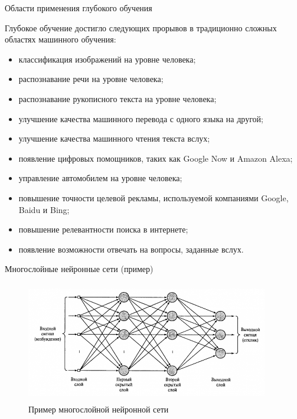 \documentclass[unicode,9pt, pdf]{beamer}
\begin{document}
	\begin{frame}{Области применения глубокого обучения}

    \vspace{0.5cm}
	Глубокое обучение достигло следующих прорывов в традиционно 
сложных областях машинного обучения:
        \begin{itemize}
            \item классификация изображений на уровне человека;
            \item распознавание речи на уровне человека;
            \item распознавание рукописного текста на уровне человека;
            \item улучшение качества машинного перевода с одного языка на другой;
            \item улучшение качества машинного чтения текста вслух;
            \item появление цифровых помощников, таких как Google Now и Amazon Alexa;
            \item управление автомобилем на уровне человека;
            \item повышение точности целевой рекламы, используемой компаниями Google, Baidu и Bing;
            \item повышение релевантности поиска в интернете;
            \item появление возможности отвечать на вопросы, заданные вслух.
        
        \end{itemize}
    \vspace{0.5cm}
        
	\end{frame}	
	
	\begin{frame}{Многослойные нейронные сети (пример)}
	    \begin{figure}
	        \centering
	        \includegraphics[width=300pt, height=150pt]{mnn.png}
	        \caption{Пример многослойной нейронной сети}
	        \label{fig:my_label}
	    \end{figure}
	\end{frame}
	
\end{document}
